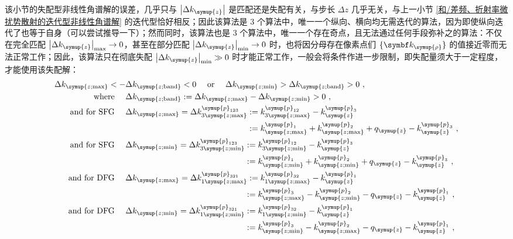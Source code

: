 该小节的失配型非线性角谱解的误差，几乎只与 $\left|\Delta k_{\symup{z}}\right|$ 是匹配还是失配有关，与步长 $\Delta z$ 几乎无关，与上一小节 \ref{和/差频、折射率微扰势散射的迭代型非线性角谱解} 的迭代型恰好相反；因此该算法是 3 个算法中，唯一一个纵向、横向均无需迭代的算法，因为即使纵向迭代了也等于自身（可以尝试推导一下）；然而同时，该算法也是 3 个算法中，唯一一个存在奇点，且无法通过任何手段弥补之的算法：不仅在完全匹配 $\left|\Delta k_{\symup{z}}\right|_{\max} \to 0$，甚至在部分匹配 $\left|\Delta k_{\symup{z}}\right|_{\min} \to 0$ 时，也将因分母存在像素点们 $\{ \symbf k_{\symup{\rho}} \}$ 的值接近零而无法正常工作；因此，该算法只在彻底失配 $\left|\Delta k_{\symup{z}}\right|_{\min} \gg 0$ 时才能正常工作，一般会将条件作进一步限制，即失配量须大于一定程度，才能使用该失配解：
\begin{subequations} \label{eq:2-294}
	\abovedisplayskip=13pt
	\belowdisplayskip=13pt
	\begin{align}
		\Delta k_{\symup{z;\max}} < - &\Delta k_{\symup{z;\text{band}}} < 0 \ \ \ \ \text{or}\ \ \ \ \Delta k_{\symup{z;\min}} > \Delta k_{\symup{z;\text{band}}} > 0 \label{eq:2-294a}~, \\ \text{where}\ \ \ \ &\Delta k_{\symup{z;\text{band}}} := \Delta k_{\symup{z;\max}} - \Delta k_{\symup{z;\min}} > 0 \label{eq:2-294b}~, \\ \text{and for SFG}\ \ \ \ &\Delta k_{\symup{z;\max}} = \Delta k^{\symup{p}_{123}}_{3\symup{z;\max}} := k^{\symup{p}_{12}}_{3\symup{z;\max}} - k^{\symup{p}_{3}}_{\symup{z}} \label{eq:2-294c} \\ &\hphantom{\Delta k_{\symup{z;\max}} = \Delta k^{\symup{p}_{123}}_{3\symup{z;\max}}} := k^{\symup{p}_{1}}_{\symup{z;\max}} + k^{\symup{p}_{2}}_{\symup{z;\max}} + q_{\symup{z}} - k^{\symup{p}_{3}}_{\symup{z}} \label{eq:2-294d}~, \\ \text{and for SFG}\ \ \ \ &\Delta k_{\symup{z;\min}} = \Delta k^{\symup{p}_{123}}_{3\symup{z;\min}} := k^{\symup{p}_{12}}_{3\symup{z;\min}} - k^{\symup{p}_{3}}_{\symup{z}} \label{eq:2-294e} \\ &\hphantom{\Delta k_{\symup{z;\min}} = \Delta k^{\symup{p}_{123}}_{3\symup{z;\min}}} := k^{\symup{p}_{1}}_{\symup{z;\min}} + k^{\symup{p}_{2}}_{\symup{z;\min}} + q_{\symup{z}} - k^{\symup{p}_{3}}_{\symup{z}} \label{eq:2-294f}~, \\ \text{and for DFG}\ \ \ \ &\Delta k_{\symup{z;\max}} = \Delta k^{\symup{p}_{321}}_{1\symup{z;\max}} := k^{\symup{p}_{32}}_{1\symup{z;\max}} - k^{\symup{p}_{1}}_{\symup{z}} \label{eq:2-294g} \\ &\hphantom{\Delta k_{\symup{z;\min}} = \Delta k^{\symup{p}_{321}}_{1\symup{z;\min}}} := k^{\symup{p}_{3}}_{\symup{z;\max}} - k^{\symup{p}_{2}}_{\symup{z;\min}} - q_{\symup{z}} - k^{\symup{p}_{1}}_{\symup{z}} \label{eq:2-294h}~, \\ \text{and for DFG}\ \ \ \ &\Delta k_{\symup{z;\min}} = \Delta k^{\symup{p}_{321}}_{1\symup{z;\min}} := k^{\symup{p}_{32}}_{1\symup{z;\min}} - k^{\symup{p}_{1}}_{\symup{z}} \label{eq:2-294i} \\ &\hphantom{\Delta k_{\symup{z;\min}} = \Delta k^{\symup{p}_{321}}_{1\symup{z;\min}}} := k^{\symup{p}_{3}}_{\symup{z;\min}} - k^{\symup{p}_{2}}_{\symup{z;\max}} - q_{\symup{z}} - k^{\symup{p}_{1}}_{\symup{z}} \label{eq:2-294j}~,

\end{align}
\end{subequations}
